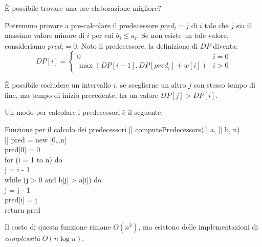 \bigskip\noindent
È possibile trovare una pre-elaborazione migliore?

Potremmo provare a pre-calcolare il predecessore $pred_i=j$ di $i$ tale che
$j$ sia il massimo valore minore di $i$ per cui $b_j\leq a_i$. Se non esiste un
tale valore, consideriamo $pred_i=0$. Noto il predecessore, la definizione di
$DP$ diventa:
\[DP[i]=\begin{cases}
    0 & i=0\\
    \max\left(DP[i-1],DP[pred_i]+w[i]\right) & i>0
\end{cases}\]
\begin{note}
    È possibile escludere un intervallo $i$, se sceglierne un altro $j$ con
    stesso tempo di fine, ma tempo di inizio precedente, ha un valore
    $DP[j]>DP[i]$.
\end{note}\noindent
Un modo per calcolare i predecessori è il seguente:

\begin{minicode}{Funzione per il calcolo dei predecessori}
\ind{}[]  computePredecessors([] a, [] b,  n)\\
    [] pred = new [0\dots n]\\
    pred[0] = 0\\
    \indf for (i = 1 to n) do\\
        j = i - 1\\
        \indff while (j > 0 and b[j] > a[i]) do\\
            j = j - 1\\
        \indff pred[i] = j\\
    \indf return pred
\end{minicode}\noindent
Il costo di questa funzione rimane $O(n^2)$, ma esistono delle implementazioni
di \emph{complessità} $O(n\log n)$.

